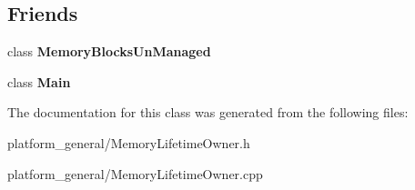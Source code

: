 \subsection*{\-Friends}
\begin{DoxyCompactItemize}
\item 
\hypertarget{classgeneral__server_1_1MemoryLifetimeOwner_aec5a6e47a8482c1f8f80af5c16b96b73}{class {\bfseries \-Memory\-Blocks\-Un\-Managed}}\label{classgeneral__server_1_1MemoryLifetimeOwner_aec5a6e47a8482c1f8f80af5c16b96b73}

\item 
\hypertarget{classgeneral__server_1_1MemoryLifetimeOwner_a992c638551243aa0ee7b50d84f4fdf54}{class {\bfseries \-Main}}\label{classgeneral__server_1_1MemoryLifetimeOwner_a992c638551243aa0ee7b50d84f4fdf54}

\end{DoxyCompactItemize}


\-The documentation for this class was generated from the following files\-:\begin{DoxyCompactItemize}
\item 
platform\-\_\-general/\-Memory\-Lifetime\-Owner.\-h\item 
platform\-\_\-general/\-Memory\-Lifetime\-Owner.\-cpp\end{DoxyCompactItemize}
